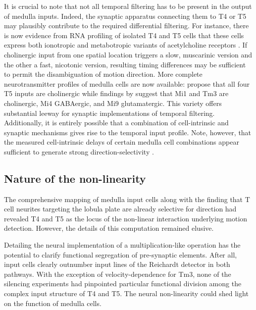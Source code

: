 It is crucial to note that not all temporal filtering has to be present in the output of medulla inputs. Indeed, the synaptic apparatus connecting them to T4 or T5 may plausibly contribute to the required differential filtering. For instance, there is now evidence from RNA profiling of isolated T4 and T5 cells that these cells express both ionotropic and metabotropic variants of acetylcholine receptors \citep{Shinomiya:2014dx,Pankova:2016aa}. If cholinergic input from one spatial location triggers a slow, muscarinic version and the other a fast, nicotonic version, resulting timing differences may be sufficient to permit the disambiguation of motion direction. More complete neurotransmitter profiles of medulla cells are now available: \citet{Shinomiya:2014dx} propose that all four T5 inputs are cholinergic while findings by \citet{Takemura:2017aa} suggest that Mi1 and Tm3 are cholinergic, Mi4 GABAergic, and Mi9 glutamatergic. This variety offers substantial leeway for synaptic implementations of temporal filtering. Additionally, it is entirely possible that a combination of cell-intrinsic and synaptic mechanisms gives rise to the temporal input profile. Note, however, that the measured cell-intrinsic delays of certain medulla cell combinations appear sufficient to generate strong direction-selectivity \citep{Arenz:2017aa}.

\subsection{Nature of the non-linearity}
The comprehensive mapping of medulla input cells along with the finding that T cell neurites targeting the lobula plate are already selective for direction had revealed T4 and T5 as the locus of the non-linear interaction underlying motion detection. However, the details of this computation remained elusive.

Detailing the neural implementation of a multiplication-like operation has the potential to clarify functional segregation of pre-synaptic elements. After all, input cells clearly outnumber input lines of the Reichardt detector in both pathways. With the exception of velocity-dependence for Tm3, none of the silencing experiments had pinpointed particular functional division among the complex input structure of T4 and T5. The neural non-linearity could shed light on the function of medulla cells.

